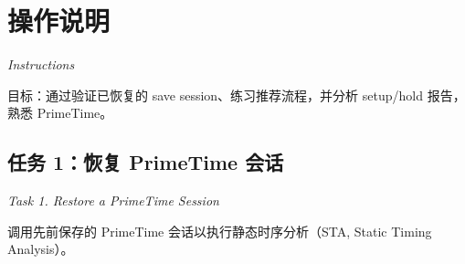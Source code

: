 \section{操作说明}
\label{lab1:instructions}

\noindent\textit{Instructions}

目标：通过验证已恢复的 save session、练习推荐流程，并分析 setup/hold 报告，熟悉 PrimeTime。

\subsection{任务 1：恢复 PrimeTime 会话}
\label{lab1:task1}

\noindent\textit{Task 1. Restore a PrimeTime Session}

调用先前保存的 PrimeTime 会话以执行静态时序分析（STA, Static Timing Analysis）。


